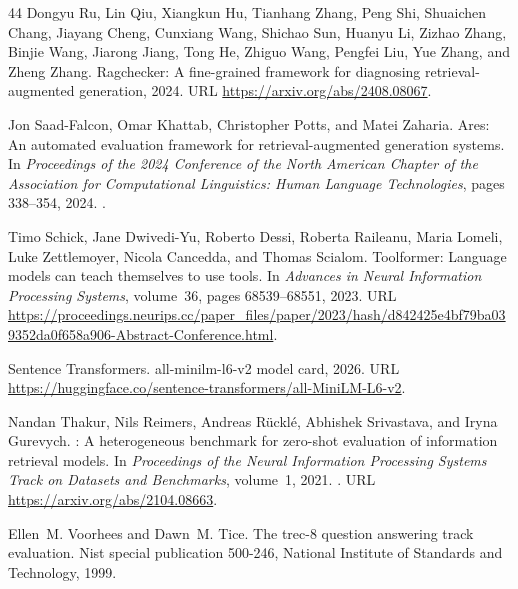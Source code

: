 \begin{thebibliography}{44}
Dongyu Ru, Lin Qiu, Xiangkun Hu, Tianhang Zhang, Peng Shi, Shuaichen Chang,
  Jiayang Cheng, Cunxiang Wang, Shichao Sun, Huanyu Li, Zizhao Zhang, Binjie
  Wang, Jiarong Jiang, Tong He, Zhiguo Wang, Pengfei Liu, Yue Zhang, and Zheng
  Zhang.
\newblock Ragchecker: A fine-grained framework for diagnosing
  retrieval-augmented generation, 2024.
\newblock URL \url{https://arxiv.org/abs/2408.08067}.

Jon Saad-Falcon, Omar Khattab, Christopher Potts, and Matei Zaharia.
\newblock Ares: An automated evaluation framework for retrieval-augmented
  generation systems.
\newblock In \emph{Proceedings of the 2024 Conference of the North American
  Chapter of the Association for Computational Linguistics: Human Language
  Technologies}, pages 338--354, 2024.
\newblock {}.

Timo Schick, Jane Dwivedi-Yu, Roberto Dessi, Roberta Raileanu, Maria Lomeli,
  Luke Zettlemoyer, Nicola Cancedda, and Thomas Scialom.
\newblock Toolformer: Language models can teach themselves to use tools.
\newblock In \emph{Advances in Neural Information Processing Systems},
  volume~36, pages 68539--68551, 2023.
\newblock URL
  \url{https://proceedings.neurips.cc/paper_files/paper/2023/hash/d842425e4bf79ba039352da0f658a906-Abstract-Conference.html}.

{Sentence Transformers}.
\newblock all-minilm-l6-v2 model card, 2026.
\newblock URL
  \url{https://huggingface.co/sentence-transformers/all-MiniLM-L6-v2}.

Nandan Thakur, Nils Reimers, Andreas R\"uckl\'e, Abhishek Srivastava, and Iryna
  Gurevych.
: A heterogeneous benchmark for zero-shot evaluation of
  information retrieval models.
\newblock In \emph{Proceedings of the Neural Information Processing Systems
  Track on Datasets and Benchmarks}, volume~1, 2021.
\newblock {}.
\newblock URL \url{https://arxiv.org/abs/2104.08663}.

Ellen~M. Voorhees and Dawn~M. Tice.
\newblock The trec-8 question answering track evaluation.
\newblock Nist special publication 500-246, National Institute of Standards and
  Technology, 1999.


\end{thebibliography}
